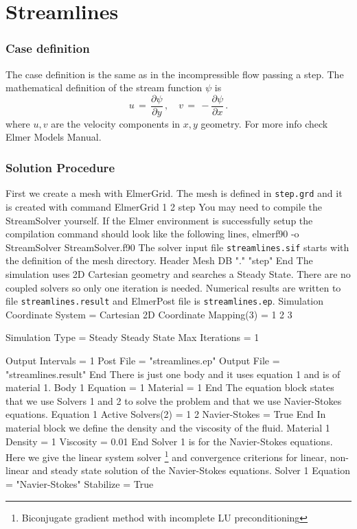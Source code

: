 \chapter{Streamlines}


\subsection*{Case definition}
The case definition is the same as in the incompressible flow passing a step.
The mathematical definition of the stream function $\psi$ is
\begin{equation}
u \, = \, \frac{\partial \psi}{\partial y} \, , \quad
v \, = \, - \frac{\partial \psi}{\partial x} \,.
\end{equation}
where $u,v$ are the velocity components in $x,y$ geometry.
For more info check Elmer Models Manual.

\subsection*{Solution Procedure}
First we create a mesh with ElmerGrid. The mesh is defined in
{\tt step.grd} and it is created with command
\ttbegin
ElmerGrid 1 2 step
\ttend
You may need to compile the StreamSolver yourself. If the Elmer environment is 
successfully setup the compilation command should look like
the following lines, 
\ttbegin
elmerf90 -o StreamSolver StreamSolver.f90
\ttend
The solver input file {\tt streamlines.sif} starts with 
the definition of the mesh directory. 
\ttbegin
Header
  Mesh DB "." "step"
End
\ttend
The simulation uses 2D Cartesian geometry and searches a Steady State.
There are no coupled solvers so only one iteration is needed. 
Numerical results are written to file {\tt streamlines.result}
and ElmerPost file is {\tt streamlines.ep}.
\ttbegin
Simulation
  Coordinate System =  Cartesian 2D
  Coordinate Mapping(3) = 1 2 3

  Simulation Type = Steady
  Steady State Max Iterations = 1

  Output Intervals = 1
  Post File = "streamlines.ep"
  Output File = "streamlines.result"
End
\ttend
There is just one body and it uses equation 1 and
is of material 1.
\ttbegin
Body 1
  Equation = 1
  Material = 1
End
\ttend
The equation block states that we use Solvers 1 and 2 to solve the problem
and that we use Navier-Stokes equations.
\ttbegin
Equation 1
  Active Solvers(2) = 1 2
  Navier-Stokes = True
End
\ttend
In material block we define the density and the viscosity of the fluid.
\ttbegin
Material 1
  Density = 1
  Viscosity = 0.01
End
\ttend
Solver 1 is for the Navier-Stokes equations.
Here we give the linear system solver
\footnote{Biconjugate gradient method with incomplete LU preconditioning}
and convergence criterions for linear, non-linear and steady state 
solution of the Navier-Stokes equations.
\ttbegin
Solver 1
  Equation = "Navier-Stokes"
  Stabilize = True

